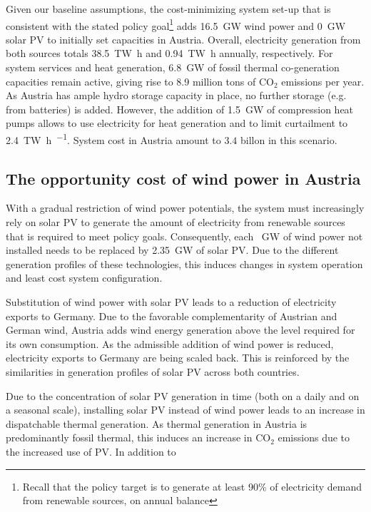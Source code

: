 \documentclass[final, 3p, times]{elsarticle} %
\newcommand{\COO}{\ensuremath{\mathrm{CO_2}} }
\begin{document}
    Given our baseline assumptions, the cost-minimizing system set-up that is consistent with the stated policy
    goal\footnote{Recall that the policy target is to generate at least 90\% of electricity demand from renewable sources, on annual balance}
    adds \SI{16.5}{\giga\watt} wind power and \SI{0}{\giga\watt} solar PV to initially set capacities in Austria.
    Overall, electricity generation from both sources totals \SI{38.5}{\tera\watt\hour} and
    \SI{0.94}{\tera\watt\hour} annually, respectively.
    For system services and heat generation, \SI{6.8}{\giga\watt} of fossil thermal co-generation capacities remain
    active, giving rise to \SI{8.9}{} million tons of \COO emissions per year.
    As Austria has ample hydro storage capacity in place, no further storage (e.g. from batteries) is added.
    However, the addition of \SI{1.5}{\giga\watt} of compression heat pumps allows to use electricity for heat
    generation and to limit curtailment to \SI{2.4}{\tera\watt\hour\per\year}.
    System cost in Austria amount to $3.4$ billon \EUR in this scenario.

    \subsection{The opportunity cost of wind power in Austria}\label{subsec:opportunity-cost-wind}
    With a gradual restriction of wind power potentials, the system must increasingly rely on solar PV to generate the
    amount of electricity from renewable sources that is required to meet policy goals.
    Consequently, each \SI{}{\giga\watt} of wind power not installed needs to be replaced by \SI{2.35}{\giga\watt} of
    solar PV\@.
    Due to the different generation profiles of these technologies, this induces changes in system operation and least
    cost system configuration.

    Substitution of wind power with solar PV leads to a reduction of electricity exports to Germany.
    Due to the favorable complementarity of Austrian and German wind, Austria adds wind energy generation above the level
    required for its own consumption.
    As the admissible addition of wind power is reduced, electricity exports to Germany are being scaled back.
    This is reinforced by the similarities in generation profiles of solar PV across both countries.

    Due to the concentration of solar PV generation in time (both on a daily and on a seasonal scale), installing solar
    PV instead of wind power leads to an increase in dispatchable thermal generation.
    As thermal generation in Austria is predominantly fossil thermal, this induces an increase in \COO emissions due
    to the increased use of PV\@.
    In addition to
\end{document}
